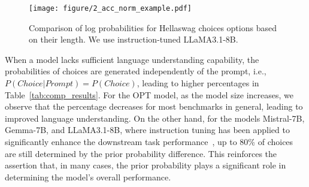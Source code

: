 
\begin{figure*}[!t]
   \centering
   \texttt{[image: figure/2\_acc\_norm\_example.pdf]}
   \caption{Comparison of log probabilities for Hellaswag choices options based on their length. We use instruction-tuned LLaMA3.1-8B.}
\label{fig:len_prob_distribution}
\end{figure*}


When a model lacks sufficient language understanding capability, the probabilities of choices are generated independently of the prompt, i.e., {\small $P(Choice|Prompt)=P(Choice)$}, leading to higher percentages in Table~\ref{tab:comp_results}. For the OPT model, as the model size increases, we observe that the percentage decreases for most benchmarks in general, leading to improved language understanding. On the other hand, for the models Mistral-7B, Gemma-7B, and LLaMA3.1-8B, where instruction tuning has been applied to significantly enhance the downstream task performance~\citep{ouyang2022training, rafailov2024direct}, up to 80\% of choices are still determined by the prior probability difference. This reinforces the assertion that, in many cases, the prior probability plays a significant role in determining the model's overall performance. 

